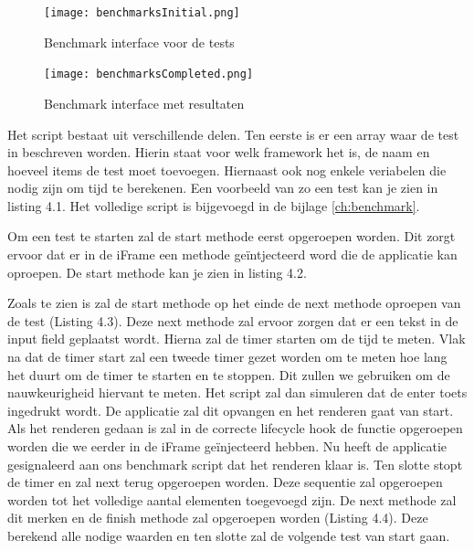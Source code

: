 \begin{figure}[h!]
	\caption{Benchmark interface voor de tests}
	\centering
	\texttt{[image: benchmarksInitial.png]}
	\label{fig:benchmark_empty}
\end{figure}
\begin{figure}[h!]
	\caption{Benchmark interface met resultaten}
	\centering
	\texttt{[image: benchmarksCompleted.png]}
	\label{fig:benchmark_completed}
\end{figure}

Het script bestaat uit verschillende delen. Ten eerste is er een array waar de test in beschreven worden. Hierin staat voor welk framework het is, de naam en hoeveel items de test moet toevoegen. Hiernaast ook nog enkele veriabelen die nodig zijn om tijd te berekenen. Een voorbeeld van zo een test kan je zien in listing 4.1. Het volledige script is bijgevoegd in de bijlage \ref{ch:benchmark}.


Om een test te starten zal de start methode eerst opgeroepen worden. Dit zorgt ervoor dat er in de iFrame een methode geïntjecteerd word die de applicatie kan oproepen. De start methode kan je zien in listing 4.2.


Zoals te zien is zal de start methode op het einde de next methode oproepen van de test (Listing 4.3). Deze next methode zal ervoor zorgen dat er een tekst in de input field geplaatst wordt. Hierna zal de timer starten om de tijd te meten. Vlak na dat de timer start zal een tweede timer gezet worden om te meten hoe lang het duurt om de timer te starten en te stoppen. Dit zullen we gebruiken om de nauwkeurigheid hiervant te meten. Het script zal dan simuleren dat de enter toets ingedrukt wordt. De applicatie zal dit opvangen en het renderen gaat van start. Als het renderen gedaan is zal in de correcte lifecycle hook de functie opgeroepen worden die we eerder in de iFrame geïnjecteerd hebben. Nu heeft de applicatie gesignaleerd aan ons benchmark script dat het renderen klaar is. Ten slotte stopt de timer en zal next terug opgeroepen worden. Deze sequentie zal opgeroepen worden tot het volledige aantal elementen toegevoegd zijn. De next methode zal dit merken en de finish methode zal opgeroepen worden (Listing 4.4). Deze berekend alle nodige waarden en ten slotte zal de volgende test van start gaan.


